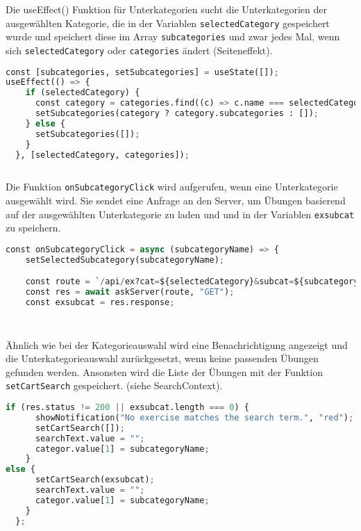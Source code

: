 Die useEffect() Funktion für Unterkategorien sucht die Unterkategorien der ausgewählten Kategorie, die in der Variablen \texttt{selectedCategory} gespeichert wurde und speichert diese im Array \texttt{subcategories} und zwar jedes Mal, wenn sich \texttt{selectedCategory} oder \texttt{categories} ändert (Seiteneffekt). 


\begin{lstlisting}[language=Python]
const [subcategories, setSubcategories] = useState([]);
useEffect(() => {
    if (selectedCategory) {
      const category = categories.find((c) => c.name === selectedCategory);
      setSubcategories(category ? category.subcategories : []);
    } else {
      setSubcategories([]);
    }
  }, [selectedCategory, categories]);
      
\end{lstlisting}



Die Funktion \texttt{onSubcategoryClick} wird aufgerufen, wenn eine Unterkategorie ausgewählt wird. Sie sendet eine Anfrage an den Server, um Übungen basierend auf der ausgewählten Unterkategorie zu laden und und in der Variablen \texttt{exsubcat} zu speichern.

\begin{lstlisting}[language=Python]
const onSubcategoryClick = async (subcategoryName) => {
    setSelectedSubcategory(subcategoryName);

    const route = `/api/ex?cat=${selectedCategory}&subcat=${subcategoryName}`;
    const res = await askServer(route, "GET");
    const exsubcat = res.response;
    
    
\end{lstlisting}

 Ähnlich wie bei der Kategorieauswahl wird eine Benachrichtigung angezeigt und die Unterkategorieauswahl zurückgesetzt, wenn keine passenden Übungen gefunden werden. Ansonsten wird die Liste der Übungen mit der Funktion \texttt{setCartSearch} gespeichert. (siehe SearchContext).


\begin{lstlisting}[language=Python]
if (res.status != 200 || exsubcat.length === 0) {
      showNotification("No exercise matches the search term.", "red");
      setCartSearch([]);
      searchText.value = "";
      categor.value[1] = subcategoryName;
    }
else {
      setCartSearch(exsubcat);
      searchText.value = "";
      categor.value[1] = subcategoryName;
    }
  };
\end{lstlisting}